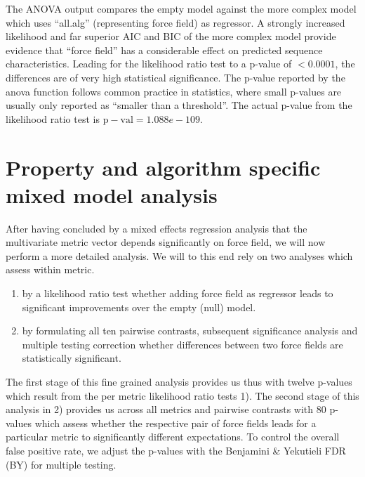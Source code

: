 \documentclass{article}\usepackage[table]{xcolor}
\renewcommand{\$}{$} %
\begin{document}
The ANOVA output compares the empty model against the more complex
model which uses ``all.alg'' (representing force field) as
regressor. A strongly increased likelihood and far superior AIC and
BIC of the more complex model provide evidence that ``force field''
has a considerable effect on predicted sequence characteristics.
Leading for the likelihood ratio test to a p-value of $<0.0001$, the
differences are of very high statistical significance. The p-value
reported by the anova function follows common practice in statistics,
where small p-values are usually only reported as ``smaller than a
threshold''. The actual p-value from the likelihood ratio test is
$\mathrm{p-val}=1.088e-109$.
\section{Property and algorithm specific mixed model analysis}
After having concluded by a mixed effects regression analysis that the
multivariate metric vector depends significantly on force field, we
will now perform a more detailed analysis. We will to this end rely on
two analyses which assess within metric. 
\begin{enumerate}
\item by a likelihood ratio test whether adding force field as
  regressor leads to significant improvements over the empty (null)
  model.
\item by formulating all ten pairwise contrasts, subsequent
  significance analysis and multiple testing correction whether
  differences between two force fields are statistically significant.
\end{enumerate}
The first stage of this fine grained analysis provides us thus with
twelve p-values which result from the per metric likelihood ratio
tests 1). The second stage of this analysis in 2) provides us across
all metrics and pairwise contrasts with $80$ p-values which assess
whether the respective pair of force fields leads for a particular
metric to significantly different expectations. To control the overall
false positive rate, we adjust the p-values with the Benjamini \&
Yekutieli FDR (BY) for multiple testing.
\end{document}

